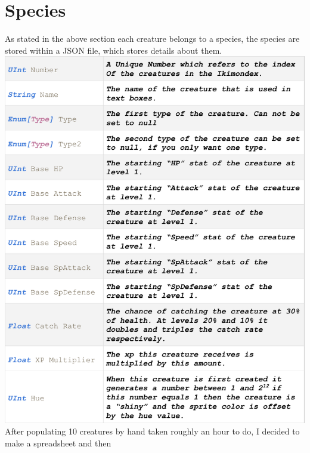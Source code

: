 \documentclass[11pt,a4paper]{article}
\begin{document}
		



\section{Species}
As stated in the above section each creature belongs to a species, the species are stored within a JSON file, which stores details about them.
\includegraphics[scale=0.76]{Class.pdf}\newpage
After populating 10 creatures by hand taken roughly an hour to do, I decided to make a spreadsheet and then 
\newpage


\end{document}
